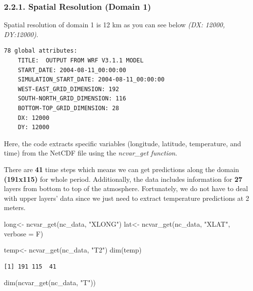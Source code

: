 \documentclass[
  letterpaper,
  DIV=11,
  numbers=noendperiod,
  abstract]{scrartcl}
\newenvironment{Shaded}{\begin{snugshade}}{\end{snugshade}}
\newcommand{\AttributeTok}[1]{\textcolor[rgb]{0.40,0.45,0.13}{#1}}
\newcommand{\FunctionTok}[1]{\textcolor[rgb]{0.28,0.35,0.67}{#1}}
\newcommand{\NormalTok}[1]{\textcolor[rgb]{0.00,0.23,0.31}{#1}}
\newcommand{\OtherTok}[1]{\textcolor[rgb]{0.00,0.23,0.31}{#1}}
\newcommand{\StringTok}[1]{\textcolor[rgb]{0.13,0.47,0.30}{#1}}
\begin{document}
\hypertarget{spatial-resolution-domain-1}{%
\subsubsection{2.2.1. Spatial Resolution (Domain
1)}\label{spatial-resolution-domain-1}}

Spatial resolution of domain 1 is 12 km as you can see below \emph{(DX:
12000, DY:12000)}.

\begin{verbatim}
78 global attributes:
    TITLE:  OUTPUT FROM WRF V3.1.1 MODEL
    START_DATE: 2004-08-11_00:00:00
    SIMULATION_START_DATE: 2004-08-11_00:00:00
    WEST-EAST_GRID_DIMENSION: 192
    SOUTH-NORTH_GRID_DIMENSION: 116
    BOTTOM-TOP_GRID_DIMENSION: 28
    DX: 12000
    DY: 12000
\end{verbatim}

Here, the code extracts specific variables (longitude, latitude,
temperature, and time) from the NetCDF file using the \emph{ncvar\_get
function}.

There are \textbf{41} time steps which means we can get predictions
along the domain \textbf{(191x115)} for whole period. Additionally, the
data includes information for \textbf{27} layers from bottom to top of
the atmosphere. Fortunately, we do not have to deal with upper layers'
data since we just need to extract temperature predictions at 2 meters.

\begin{Shaded}
\begin{Highlighting}[]
\NormalTok{long}\OtherTok{\textless{}{-}} \FunctionTok{ncvar\_get}\NormalTok{(nc\_data, }\StringTok{"XLONG"}\NormalTok{)}
\NormalTok{lat}\OtherTok{\textless{}{-}} \FunctionTok{ncvar\_get}\NormalTok{(nc\_data, }\StringTok{"XLAT"}\NormalTok{, }\AttributeTok{verbose =}\NormalTok{ F)}

\NormalTok{temp}\OtherTok{\textless{}{-}} \FunctionTok{ncvar\_get}\NormalTok{(nc\_data, }\StringTok{"T2"}\NormalTok{) }
\FunctionTok{dim}\NormalTok{(temp)}
\end{Highlighting}
\end{Shaded}

\begin{verbatim}
[1] 191 115  41
\end{verbatim}

\begin{Shaded}
\begin{Highlighting}[]
\FunctionTok{dim}\NormalTok{(}\FunctionTok{ncvar\_get}\NormalTok{(nc\_data, }\StringTok{"T"}\NormalTok{))}
\end{Highlighting}
\end{Shaded}
\end{document}
